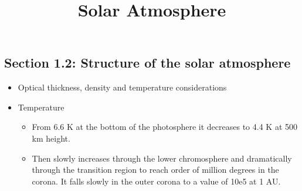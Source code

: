 \documentclass{../template/texnote}
\title{Solar Atmosphere}
\begin{document}
    \maketitle {}


	\subsection{Section 1.2: Structure of the solar atmosphere}
\begin{itemize}
	\item Optical thickness, density and temperature considerations
	\item Temperature
		\begin{itemize}
			\item From 6.6 K at the bottom of the photosphere it decreases to 4.4 K at 500 km height.
			\item Then slowly increases through the lower chromosphere and dramatically through the transition region to reach order of million degrees in the corona. It falls slowly in the outer corona to a value of 10e5 at 1 AU.
		\end{itemize}
\end{itemize}
    \printbibliography
\end{document}
